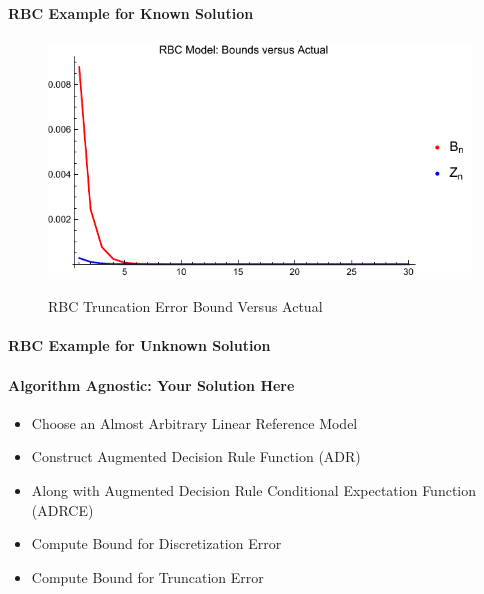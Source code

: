 \documentclass[12pt]{article}
\begin{document}
\paragraph{RBC Example for Known Solution}


\begin{figure}
  \centering
\includegraphics{simpBoundsVActual.pdf}  
  \label{rbcTrunc}
  \caption{RBC Truncation Error Bound Versus Actual}
\end{figure}

\paragraph{RBC Example for Unknown Solution}
\paragraph{Algorithm Agnostic: Your Solution Here}




    
\begin{itemize}
\item Choose an Almost  Arbitrary Linear Reference Model
\item Construct Augmented Decision Rule Function (ADR)
\item Along with Augmented Decision Rule Conditional Expectation Function (ADRCE)
\item Compute Bound for Discretization Error
\item Compute Bound for Truncation Error
\end{itemize}
\end{document}

